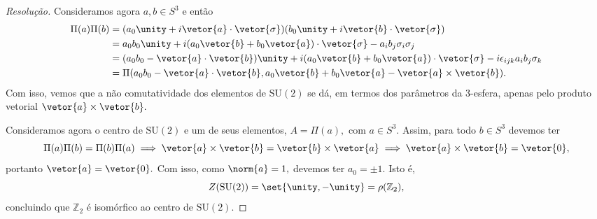 \begin{proof}[Resolução]
    Consideramos agora \(a, b \in S^3\) e então
    \begin{align*}
        \Pi(a)\Pi(b) &= (a_0 \unity + i \vetor{a} \cdot \vetor{\sigma})(b_0 \unity + i \vetor{b} \cdot \vetor{\sigma})\\
                     &= a_0 b_0 \unity + i (a_0 \vetor{b} + b_0 \vetor{a})\cdot\vetor{\sigma} - a_i b_j \sigma_i \sigma_j\\
                     &= (a_0 b_0 - \vetor{a} \cdot \vetor{b}) \unity + i (a_0 \vetor{b} + b_0 \vetor{a})\cdot \vetor{\sigma} - i \epsilon_{ijk} a_i b_j \sigma_k\\
                     &= \Pi(a_0 b_0 - \vetor{a} \cdot \vetor{b}, a_0 \vetor{b} + b_0\vetor{a} - \vetor{a} \times \vetor{b}).
    \end{align*}
    Com isso, vemos que a não comutatividade dos elementos de \(\mathrm{SU}(2)\) se dá, em termos dos parâmetros da 3-esfera, apenas pelo produto vetorial \(\vetor{a} \times \vetor{b}.\) 

    Consideramos agora o centro de \(\mathrm{SU}(2)\) e um de seus elementos, \(A = \Pi(a),\) com \(a \in S^3.\) Assim, para todo \(b \in S^3\) devemos ter
    \begin{equation*}
        \Pi(a) \Pi(b) = \Pi(b) \Pi(a) \implies \vetor{a} \times \vetor{b} = \vetor{b} \times \vetor{a} \implies \vetor{a}\times\vetor{b} = \vetor{0},
    \end{equation*}
    portanto \(\vetor{a} = \vetor{0}.\) Com isso, como \(\norm{a} = 1,\) devemos ter \(a_0 = \pm1.\) Isto é, 
    \begin{equation*}
        Z(\mathrm{SU}(2)) = \set{\unity, -\unity} = \rho(\mathbb{Z}_2),
    \end{equation*}
    concluindo que \(\mathbb{Z}_2\) é isomórfico ao centro de \(\mathrm{SU}(2).\)
\end{proof}
